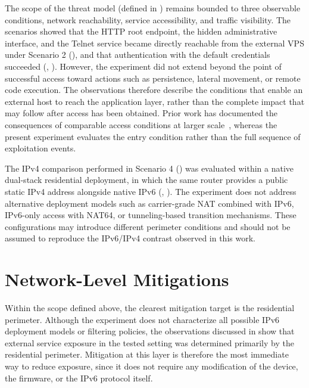The scope of the threat model (defined in ) remains bounded to three observable conditions, network reachability, service accessibility, and traffic visibility. The scenarios showed that the HTTP root endpoint, the hidden administrative interface, and the Telnet service became directly reachable from the external VPS under Scenario 2 (), and that authentication with the default credentials succeeded (, ). However, the experiment did not extend beyond the point of successful access toward actions such as persistence, lateral movement, or remote code execution. The observations therefore describe the conditions that enable an external host to reach the application layer, rather than the complete impact that may follow after access has been obtained. Prior work has documented the consequences of comparable access conditions at larger scale~\cite{antonakakis2017mirai,alrawi2019sok,liu2025eagleye}, whereas the present experiment evaluates the entry condition rather than the full sequence of exploitation events.

The IPv4 comparison performed in Scenario 4 () was evaluated within a native dual-stack residential deployment, in which the same router provides a public static IPv4 address alongside native IPv6 (, ). The experiment does not address alternative deployment models such as carrier-grade NAT combined with IPv6, IPv6-only access with NAT64, or tunneling-based transition mechanisms. These configurations may introduce different perimeter conditions and should not be assumed to reproduce the IPv6/IPv4 contrast observed in this work.

\section{Network-Level Mitigations}\label{sec:network-mitigations}
Within the scope defined above, the clearest mitigation target is the residential perimeter. Although the experiment does not characterize all possible IPv6 deployment models or filtering policies, the observations discussed in  show that external service exposure in the tested setting was determined primarily by the residential perimeter. Mitigation at this layer is therefore the most immediate way to reduce exposure, since it does not require any modification of the device, the firmware, or the IPv6 protocol itself.

